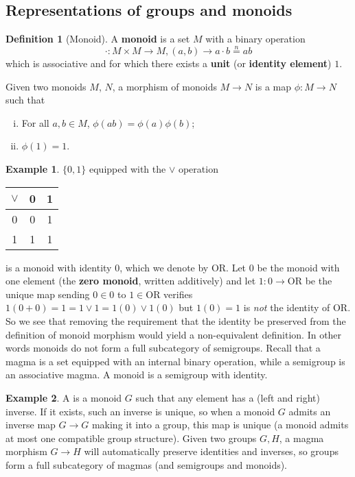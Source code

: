 \documentclass[a4paper,12pt,parskip=half*,chapterprefix=true,numbers=noendperiod]{scrreprt}
\theoremstyle{definition}
\newtheorem{definition}{Definition}[section]
\newtheorem{example}{Example}[section]
\theoremstyle{remark}
\begin{document}
\subsection{Representations of groups and monoids}

\begin{definition}[Monoid]
	A \textbf{monoid} is a set $M$ with a binary operation
	\begin{equation*}
		\cdot:M\times M\to M,(a,b)\to a\cdot b\overset{n}{=} ab
	\end{equation*}
	which is associative and for which there exists a \textbf{unit} (or \textbf{identity element}) $1$.
	
	Given two monoids $M$, $N$, a morphism of monoids $M\to N$ is a map $\phi:M\to N$ such that
	\begin{enumerate}[(i)]
		\item For all $a,b\in M$, $\phi(ab)=\phi(a)\phi(b)$;
		\item $\phi(1)=1$.
	\end{enumerate}
\end{definition}

\begin{example}
	$\{0,1\}$ equipped with the $\vee$ operation
	\begin{center}
	\begin{tabular}{|c|c|c|}
	\hline
	$\vee$ & 0 & 1 \\
	\hline
	0 & 0 & 1 \\
	\hline
	1 & 1 & 1 \\
	\hline
	\end{tabular}
	\end{center}
	is a monoid with identity $0$, which we denote by OR. Let $0$ be the monoid with one element (the \textbf{zero monoid}, written additively) and let $1:0\to\text{OR}$ be the unique map sending $0\in 0$ to $1\in\text{OR}$ verifies $1(0+0)=1=1\vee 1=1(0)\vee 1(0)$ but $1(0)=1$ is \emph{not} the identity of OR. So we see that removing the requirement that the identity be preserved from the definition of monoid morphism would yield a non-equivalent definition. In other words monoids do not form a full subcategory of semigroups. Recall that a magma is a set equipped with an internal binary operation, while a semigroup is an associative magma. A monoid is a semigroup with identity.
\end{example}
\begin{example}
	A  is a monoid $G$ such that any element has a (left and right) inverse. If it exists, such an inverse is unique, so when a monoid $G$ admits an inverse map $G\to G$ making it into a group, this map is unique (a monoid admits at most one compatible group structure). Given two groups $G,H$, a magma morphism $G\to H$ will automatically preserve identities and inverses, so groups form a full subcategory of magmas (and semigroups and monoids).
\end{example}
\end{document}
